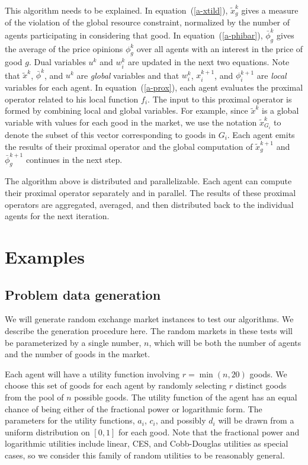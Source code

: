 \documentclass[12pt]{article}
\begin{document}
This algorithm needs to be explained. In equation~(\ref{a-xtild}),
$\tilde{x}^k_g$ gives a measure of the violation of the global resource
constraint, normalized by the number of agents participating in considering
that good. In equation~(\ref{a-phibar}), $\bar{\phi}^k_g$ gives the average of
the price opinions $\phi^k_g$ over all agents with an interest in the price of
good $g$. Dual variables $u^k$ and $w^k_i$ are updated in the next two
equations. Note that $\tilde{x}^k$, $\bar{\phi}^k$, and $u^k$ are \emph{global}
variables and that $w_i^k$, $x_i^{k+1}$, and $\phi_i^{k+1}$ are \emph{local}
variables for each agent. In equation~(\ref{a-prox}), each agent evaluates the
proximal operator related to his local function $f_i$. The input to this
proximal operator is formed by combining local and global variables. For
example, since $\tilde{x}^k$ is a global variable with values for each good in
the market, we use the notation $\tilde{x}^k_{G_i}$ to denote the subset of
this vector corresponding to goods in $G_i$. Each agent emits the results of
their proximal operator and the global computation of $\tilde{x}^{k+1}_g$ and
$\bar{\phi}^{k+1}_g$ continues in the next step.

The algorithm above is distributed and parallelizable. Each agent can compute
their proximal operator separately and in parallel. The results of these
proximal operators are aggregated, averaged, and then distributed back to the
individual agents for the next iteration.


\section{Examples}
\label{sec:examples}
\subsection{Problem data generation}
\label{sec:random_prob}


We will generate random exchange market instances to test our algorithms. We
describe the generation procedure here. The random markets in these tests will
be parameterized by a single number, $n$, which will be both the number of
agents and the number of goods in the market.

Each agent will have a utility function involving $r = \min(n,20)$ goods. We
choose this set of goods for each agent by randomly selecting $r$ distinct
goods from the pool of $n$ possible goods. The utility function of the agent
has an equal chance of  being either of the fractional power or logarithmic
form. The parameters for the utility functions, $a_i$, $c_i$, and possibly
$d_i$ will be drawn from a uniform distribution on $[0,1]$ for each good. Note
that the fractional power and logarithmic utilities include linear, CES, and
Cobb-Douglas utilities as special cases, so we consider this family of random
utilities to be reasonably general.
\end{document}
